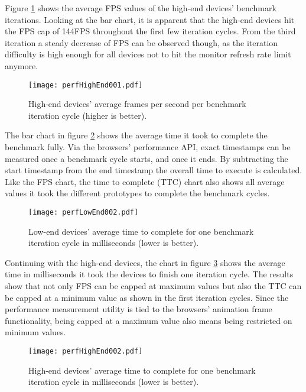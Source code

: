Figure \ref{fig:perfHighEnd001} shows the average FPS values of the high-end devices' benchmark iterations. Looking at the bar chart, it is apparent that the high-end devices hit the FPS cap of 144FPS throughout the first few iteration cycles. From the third iteration a steady decrease of FPS can be observed though, as the iteration difficulty is high enough for all devices not to hit the monitor refresh rate limit anymore.

\begin{figure}
\centering
\texttt{[image: perfHighEnd001.pdf]}
\caption{High-end devices' average frames per second per benchmark iteration cycle (higher is better).}
\label{fig:perfHighEnd001}
\end{figure}

The bar chart in figure \ref{fig:perfLowEnd002} shows the average time it took to complete the benchmark fully. Via the browsers' performance API, exact timestamps can be measured once a benchmark cycle starts, and once it ends. By subtracting the start timestamp from the end timestamp the overall time to execute is calculated. Like the FPS chart, the time to complete (TTC) chart also shows all average values it took the different prototypes to complete the benchmark cycles.

\begin{figure}
\centering
\texttt{[image: perfLowEnd002.pdf]}
\caption{Low-end devices' average time to complete for one benchmark iteration cycle in milliseconds (lower is better).}
\label{fig:perfLowEnd002}
\end{figure}

Continuing with the high-end devices, the chart in figure \ref{fig:perfHighEnd002} shows the average time in milliseconds it took the devices to finish one iteration cycle. The results show that not only FPS can be capped at maximum values but also the TTC can be capped at a minimum value as shown in the first iteration cycles. Since the performance measurement utility is tied to the browsers' animation frame functionality, being capped at a maximum value also means being restricted on minimum values.

\begin{figure}
\centering
\texttt{[image: perfHighEnd002.pdf]}
\caption{High-end devices' average time to complete for one benchmark iteration cycle in milliseconds (lower is better).}
\label{fig:perfHighEnd002}
\end{figure}

